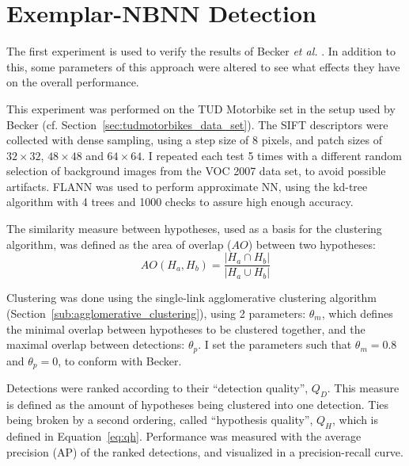 

% 

\section{Exemplar-NBNN Detection} %
\label{sec:nbnn_detection}

The first experiment is used to verify the results of Becker \emph{et al.} \cite{becker2012codebook}. In addition to this, some parameters of this approach were altered to see what effects they have on the overall performance.

This experiment was performed on the TUD Motorbike set in the setup used by Becker (cf. Section~\ref{sec:tudmotorbikes_data_set}). The SIFT descriptors were collected with dense sampling, using a step size of 8 pixels, and patch sizes of $32\times32$, $48\times48$ and $64\times64$. I repeated each test 5 times with a different random selection of background images from the VOC 2007 data set, to avoid possible artifacts. FLANN was used to perform approximate NN, using the kd-tree algorithm with 4 trees and 1000 checks to assure high enough accuracy.

The similarity measure between hypotheses, used as a basis for the clustering algorithm, was defined as the area of overlap ($AO$) between two hypotheses:
\begin{equation}
    AO(H_a, H_b)= \frac{|H_a\cap H_b|}{|H_a\cup H_b|}
\end{equation}

Clustering was done using the single-link agglomerative clustering algorithm (Section~\ref{sub:agglomerative_clustering}), using 2 parameters: $\theta_m$, which defines the minimal overlap between hypotheses to be clustered together, and the maximal overlap between detections: $\theta_p$. I set the parameters such that $\theta_m = 0.8$ and $\theta_p = 0$, to conform with Becker.

Detections were ranked according to their ``detection quality'', $Q_D$. This measure is defined as the amount of hypotheses being clustered into one detection. Ties being broken by a second ordering, called ``hypothesis quality'', $Q_H$, which is defined in Equation~\eqref{eq:qh}. Performance was measured with the average precision (AP) of the ranked detections, and visualized in a precision-recall curve.

